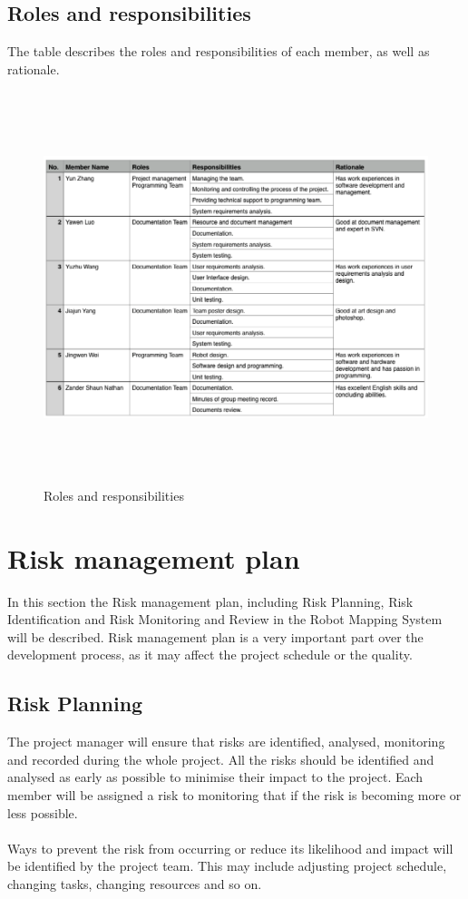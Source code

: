 \documentclass[11pt, a4paper]{article}
\begin{document}
\subsection{Roles and responsibilities}
The table describes the roles and responsibilities of each member, as well as rationale.
\begin{figure}[H]
\centering
\includegraphics[height=4.5in]{RR.png}
\caption[Roles and responsibilities]{Roles and responsibilities}
\end{figure}

\section{Risk management plan}
In this section the Risk management plan, including Risk Planning, Risk Identification and Risk Monitoring and Review in the Robot Mapping System will be described. Risk management plan is a very important part over the development process, as it may affect the project schedule or the quality.

\subsection{Risk Planning}
The project manager will ensure that risks are identified, analysed, monitoring and recorded during the whole project. All the risks should be identified and analysed as early as possible to minimise their impact to the project. Each member will be assigned a risk to monitoring that if the risk is becoming more or less possible.\\
\\
Ways to prevent the risk from occurring or reduce its likelihood and impact will be identified by the project team. This may include adjusting project schedule, changing tasks, changing resources and so on.\\
\end{document}

